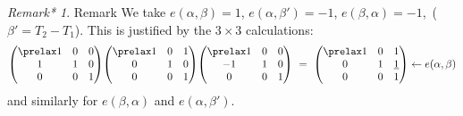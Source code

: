 \documentclass{memo-l}
\theoremstyle{definition}
\theoremstyle{remark}
\newtheorem{remark*}{Remark*} %
\numberwithin{section}{chapter}
\numberwithin{equation}{chapter}
\begin{document}
\begin{remark*}{Remark} We take $e({\alpha},{\beta}) = 1$,
$e({\alpha},{\beta}') = -1$, $e({\beta},{\alpha}) = -1$,\  
(${\beta}'  =  T_{2}-T_{1}$).
This is justified by the $3 \times 3$ calculations:
$$
{\begin{pmatrix} \prelax  1&0&0\\ 1&1&0\\ 0&0&1 \end{pmatrix}} {\begin{pmatrix} \prelax  1&0&1\\ 0&1&0\\ 0&0&1\end{pmatrix}}
{\begin{pmatrix} \prelax  
 1 & 0 & 0 \\ -1 & 1 & 0 \\ 0 & 0 & 1 \end{pmatrix}}\
=\ {\begin{pmatrix} \prelax  1 & 0 & 1 \\ 0 & 1 & {\underline{1}}\\ 0&0&1 \end{pmatrix}} \leftarrow
e(\alpha,\beta)
$$
and similarly for $e({\beta},{\alpha})$ and $e({\alpha},{\beta}')$.
\end{remark*}
\end{document}

